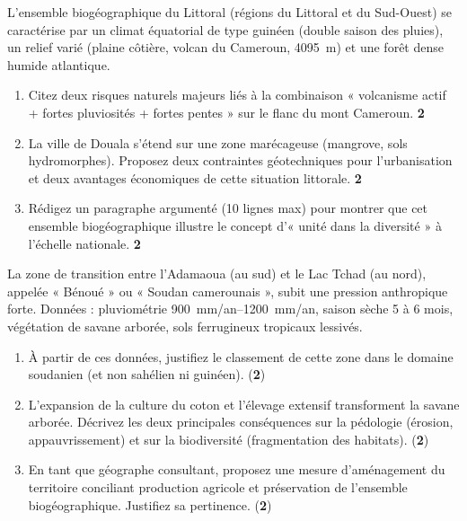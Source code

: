 \documentclass[11pt]{article}
\begin{document}
\begin{exercice}
\label{exo:littoral}
L'ensemble biogéographique du Littoral (régions du Littoral et du Sud-Ouest) se caractérise par un climat équatorial de type guinéen (double saison des pluies), un relief varié (plaine côtière, volcan du Cameroun, \SI{4095}{\metre}) et une forêt dense humide atlantique.

\begin{enumerate}
    \item Citez deux risques naturels majeurs liés à la combinaison « volcanisme actif + fortes pluviosités + fortes pentes » sur le flanc du mont Cameroun. \textbf{2}
    \item La ville de Douala s'étend sur une zone marécageuse (mangrove, sols hydromorphes). Proposez deux contraintes géotechniques pour l'urbanisation et deux avantages économiques de cette situation littorale. \textbf{2}
    \item Rédigez un paragraphe argumenté (10 lignes max) pour montrer que cet ensemble biogéographique illustre le concept d'« unité dans la diversité » à l'échelle nationale. \textbf{2}
\end{enumerate}
\end{exercice}

\begin{exercice}
\label{exo:soudan}
La zone de transition entre l'Adamaoua (au sud) et le Lac Tchad (au nord), appelée « Bénoué » ou « Soudan camerounais », subit une pression anthropique forte. Données : pluviométrie \SIrange{900}{1200}{\milli\metre/an}, saison sèche 5 à 6 mois, végétation de savane arborée, sols ferrugineux tropicaux lessivés.

\begin{enumerate}
    \item À partir de ces données, justifiez le classement de cette zone dans le domaine soudanien (et non sahélien ni guinéen). (\textbf{2})
    \item L'expansion de la culture du coton et l'élevage extensif transforment la savane arborée. Décrivez les deux principales conséquences sur la pédologie (érosion, appauvrissement) et sur la biodiversité (fragmentation des habitats). (\textbf{2})
    \item En tant que géographe consultant, proposez une mesure d'aménagement du territoire conciliant production agricole et préservation de l'ensemble biogéographique. Justifiez sa pertinence. (\textbf{2})
\end{enumerate}
\end{exercice}
\end{document}
